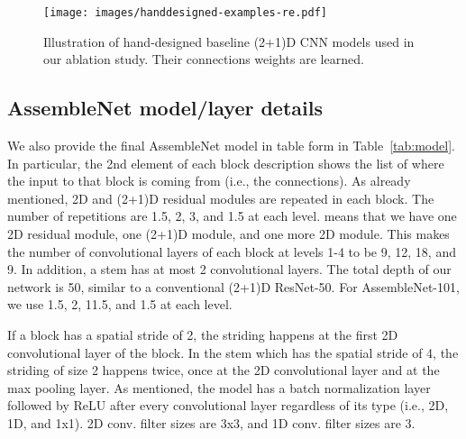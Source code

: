 \documentclass{article} \usepackage{iclr2020_conference,times}
\begin{document}
\begin{figure}
  \centering
   \texttt{[image: images/handdesigned-examples-re.pdf]}
  \caption{Illustration of hand-designed baseline (2+1)D CNN models used in our ablation study. Their connections weights are learned.}
  \label{fig:hand-examples}
\end{figure}









\subsection{AssembleNet model/layer details}

We also provide the final AssembleNet model in table form in Table~\ref{tab:model}. In particular, the 2nd element of each block description shows the list of where the input to that block is coming from (i.e., the connections). As already mentioned, 2D and (2+1)D residual modules are repeated in each block. The number of repetitions  are 1.5, 2, 3, and 1.5 at each level.  means that we have one 2D residual module, one (2+1)D module, and one more 2D module. This makes the number of convolutional layers of each block at levels 1-4 to be 9, 12, 18, and 9. In addition, a stem has at most 2 convolutional layers. The total depth of our network is 50, similar to a conventional (2+1)D ResNet-50. For AssembleNet-101, we use  1.5, 2, 11.5, and 1.5 at each level.

If a block has a spatial stride of 2, the striding happens at the first 2D convolutional layer of the block. In the stem which has the spatial stride of 4, the striding of size 2 happens twice, once at the 2D convolutional layer and at the max pooling layer. As mentioned, the model has a batch normalization layer followed by ReLU after every convolutional layer regardless of its type (i.e., 2D, 1D, and 1x1). 2D conv. filter sizes are 3x3, and 1D conv. filter sizes are 3.
\end{document}

